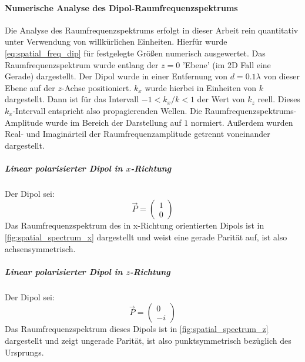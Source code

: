 \documentclass[titlepage]{article}
\begin{document}
	\paragraph{Numerische Analyse des Dipol-Raumfrequenzspektrums}
	Die Analyse des Raumfrequenzspektrums erfolgt in dieser Arbeit rein quantitativ unter Verwendung von willkürlichen Einheiten. Hierfür wurde \eqref{eq:spatial_freq_dip} für festgelegte Größen numerisch ausgewertet.
	Das Raumfrequenzspektrum wurde entlang der $z = 0$ 'Ebene' (im 2D Fall eine Gerade) dargestellt. Der Dipol wurde in einer Entfernung von $d = 0.1 \lambda$  von dieser Ebene auf der $z$-Achse positioniert. $k_x$ wurde hierbei in Einheiten von $k$ dargestellt. Dann ist für das Intervall $-1 < k_x / k <1$ der Wert von $k_z$ reell. Dieses $k_x$-Intervall entspricht also propagierenden Wellen. Die Raumfrequenzspektrums-Amplitude wurde im Bereich der Darstellung auf $1$ normiert. Außerdem wurden Real- und Imaginärteil der Raumfrequenzamplitude getrennt voneinander dargestellt.
	\subparagraph{Linear polarisierter Dipol in $x$-Richtung}
	Der Dipol sei:
	$$\vec{P} = \begin{pmatrix} 1 \\ 0\end{pmatrix}$$
	Das Raumfrequenzspektrum des in x-Richtung orientierten Dipols ist in \ref{fig:spatial_spectrum_x} dargestellt und weist eine gerade Parität auf, ist also achsensymmetrisch.	
	\subparagraph{Linear polarisierter Dipol in $z$-Richtung}
	Der Dipol sei:
	$$\vec{P} = \begin{pmatrix} 0 \\ -i\end{pmatrix}$$
	Das Raumfrequenzspektrum dieses Dipols ist in \ref{fig:spatial_spectrum_z} dargestellt und zeigt ungerade Parität, ist also punktsymmetrisch bezüglich des Ursprungs.
\end{document}
